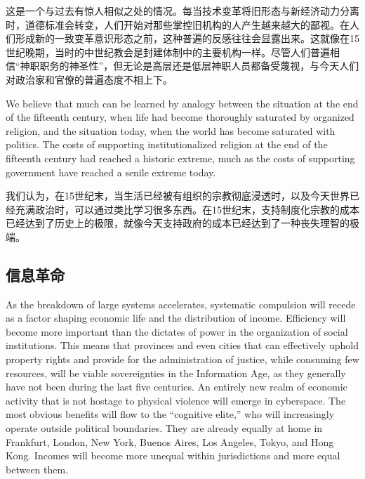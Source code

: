 \begin{Parallel}{97mm}{45mm}
  \ParallelRText
  {\small 这是一个与过去有惊人相似之处的情况。每当技术变革将旧形态与新经济动力分离时，道德标准会转变，人们开始对那些掌控旧机构的人产生越来越大的鄙视。在人们形成新的一致变革意识形态之前，这种普遍的反感往往会显露出来。这就像在15世纪晚期，当时的中世纪教会是封建体制中的主要机构一样。尽管人们普遍相信“神职职务的神圣性”，但无论是高层还是低层神职人员都备受蔑视，与今天人们对政治家和官僚的普遍态度不相上下。}

  \ParallelPar  

  \ParallelLText
  {We believe that much can be learned by analogy between the situation at the end of the fifteenth century, when life had become thoroughly saturated by organized religion, and the situation today, when the world has become saturated with politics. The costs of supporting institutionalized religion at the end of the fifteenth century had reached a historic extreme, much as the costs of supporting government have reached a senile extreme today. }
 
  \ParallelRText
  {\small 我们认为，在15世纪末，当生活已经被有组织的宗教彻底浸透时，以及今天世界已经充满政治时，可以通过类比学习很多东西。在15世纪末，支持制度化宗教的成本已经达到了历史上的极限，就像今天支持政府的成本已经达到了一种丧失理智的极端。 }

 \ParallelPar  

\subsection{信息革命}

  \ParallelLText
  {As the breakdown of large systems accelerates, systematic compulsion will recede as a factor shaping economic life and the distribution of income. Efficiency will become more important than the dictates of power in the organization of social institutions. This means that provinces and even cities that can effectively uphold property rights and provide for the administration of justice, while consuming few resources, will be viable sovereignties in the Information Age, as they generally have not been during the last five centuries. An entirely new realm of economic activity that is not hostage to physical violence will emerge in cyberspace. The most obvious benefits will flow to the “cognitive elite,” who will increasingly operate outside political boundaries. They are already equally at home in Frankfurt, London, New York, Buenos Aires, Los Angeles, Tokyo, and Hong Kong. Incomes will become more unequal within jurisdictions and more equal between them.}
  

\end{Parallel}
